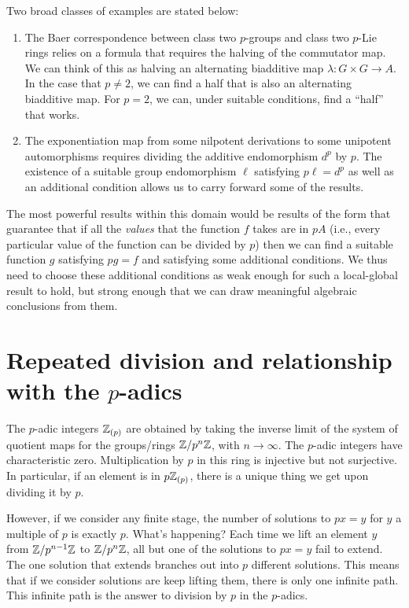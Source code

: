 \documentclass[10pt]{amsart}
\begin{document}
Two broad classes of examples are stated below:

\begin{enumerate}
\item The Baer correspondence between class two $p$-groups and class
  two $p$-Lie rings relies on a formula that requires the halving of
  the commutator map. We can think of this as halving an alternating
  biadditive map $\lambda:G \times G \to A$. In the case that $p \ne
  2$, we can find a half that is also an alternating biadditive
  map. For $p = 2$, we can, under suitable conditions, find a ``half''
  that works.
\item The exponentiation map from some nilpotent derivations to some
  unipotent automorphisms requires dividing the additive endomorphism
  $d^p$ by $p$. The existence of a suitable group endomorphism $\ell$
  satisfying $p\ell = d^p$ as well as an additional condition allows
  us to carry forward some of the results.
\end{enumerate}

The most powerful results within this domain would be results of the
form that guarantee that if all the {\em values} that the function $f$
takes are in $pA$ (i.e., every particular value of the function can be
divided by $p$) then we can find a suitable function $g$ satisfying
$pg = f$ and satisfying some additional conditions. We thus need to
choose these additional conditions as weak enough for such a
local-global result to hold, but strong enough that we can draw
meaningful algebraic conclusions from them.

\section*{Repeated division and relationship with the $p$-adics}

The $p$-adic integers $\mathbb{Z}_{(p)}$ are obtained by taking the inverse
limit of the system of quotient maps for the groups/rings $\mathbb{Z}/p^n\mathbb{Z}$,
with $n \to \infty$. The $p$-adic integers have characteristic
zero. Multiplication by $p$ in this ring is injective but not
surjective. In particular, if an element is in $p\mathbb{Z}_{(p)}$, there is a
unique thing we get upon dividing it by $p$.

However, if we consider any finite stage, the number of solutions to
$px = y$ for $y$ a multiple of $p$ is exactly $p$. What's happening?
Each time we lift an element $y$ from $\mathbb{Z}/p^{n-1}\mathbb{Z}$ to $\mathbb{Z}/p^n\mathbb{Z}$,
all but one of the solutions to $px = y$ fail to extend. The one
solution that extends branches out into $p$ different solutions. This
means that if we consider solutions are keep lifting them, there is
only one infinite path. This infinite path is the answer to division
by $p$ in the $p$-adics.
\end{document}
